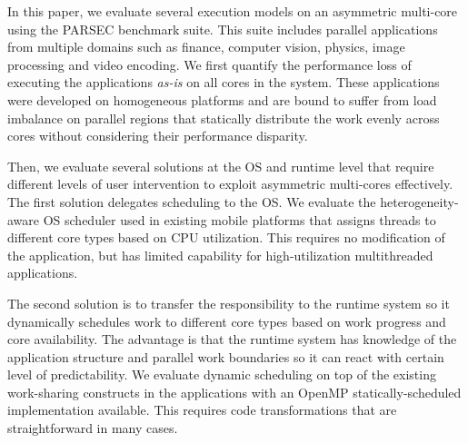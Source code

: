 
In this paper, we evaluate several execution models on an asymmetric multi-core
using the PARSEC benchmark suite. This suite includes parallel applications from multiple domains 
such as finance, computer vision, physics, image processing and video encoding. We first quantify 
the performance loss of executing the applications \textit{as-is} on all cores 
in the system. These applications were developed on homogeneous platforms and are bound to suffer from
load imbalance on parallel regions that statically distribute the work
evenly across cores without considering their performance disparity.

Then, we evaluate several solutions at the OS and runtime level that require different
levels of user intervention to exploit asymmetric multi-cores effectively. The first
solution delegates scheduling to the OS. We evaluate the heterogeneity-aware
OS scheduler used in existing mobile platforms that assigns threads to different
core types based on CPU utilization. This requires no modification of the
application, but has limited capability for high-utilization multithreaded applications.



The second solution is to transfer the responsibility to the runtime system so it 
dynamically schedules work to different core types based on work progress and core 
availability. The advantage is that the runtime system has knowledge of the application 
structure and parallel work boundaries so it can react with certain level of predictability. 
We evaluate dynamic scheduling on top of the existing work-sharing constructs in the applications 
with an OpenMP statically-scheduled implementation available. This requires code transformations 
that are straightforward in many cases.

